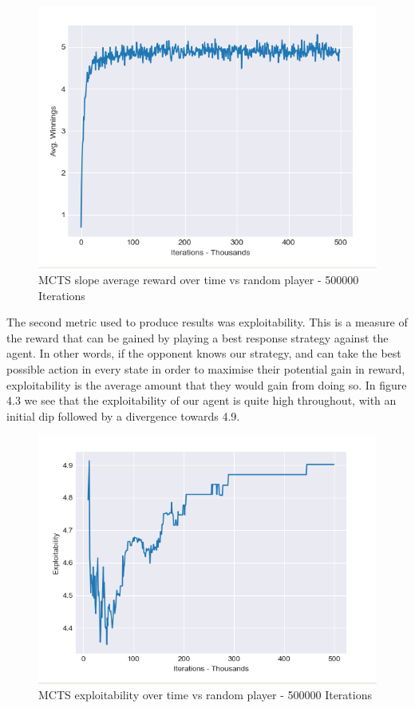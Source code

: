 \begin{figure}[ht]
    \includegraphics[scale=.7]{images/avg_reward_500000__20_random.png}
    \caption{MCTS slope average reward over time vs random player - 500000 Iterations}
\end{figure}

The second metric used to produce results was exploitability.
This is a measure of the reward that can be gained by playing a best response strategy
against the agent.
In other words, if the opponent knows our strategy, and can take the best possible action
in every state in order to maximise their potential gain in reward, exploitability is the
average amount that they would gain from doing so.
In figure 4.3 we see that the exploitability of our agent is quite high throughout, with an
initial dip followed by a divergence towards 4.9.

\begin{figure}[ht]
    \includegraphics[scale=.7]{images/exploitability_500000_20_random.png}
    \caption{MCTS exploitability over time vs random player - 500000 Iterations}
\end{figure}

